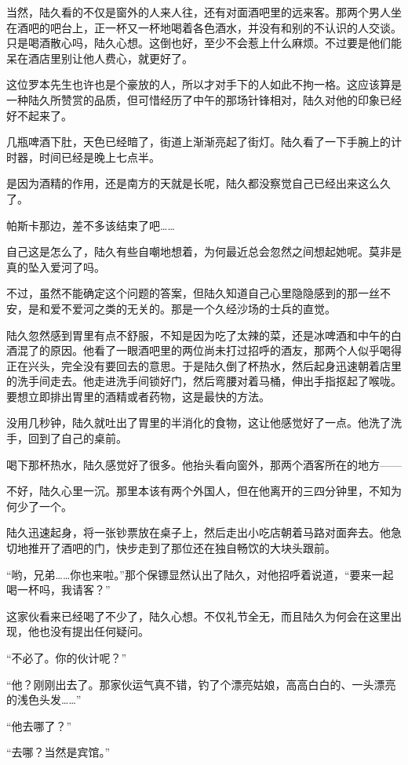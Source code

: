 当然，陆久看的不仅是窗外的人来人往，还有对面酒吧里的远来客。那两个男人坐在酒吧的吧台上，正一杯又一杯地喝着各色酒水，并没有和别的不认识的人交谈。只是喝酒散心吗，陆久心想。这倒也好，至少不会惹上什么麻烦。不过要是他们能呆在酒店里别让他人费心，就更好了。

这位罗本先生也许也是个豪放的人，所以才对手下的人如此不拘一格。这应该算是一种陆久所赞赏的品质，但可惜经历了中午的那场针锋相对，陆久对他的印象已经好不起来了。

几瓶啤酒下肚，天色已经暗了，街道上渐渐亮起了街灯。陆久看了一下手腕上的计时器，时间已经是晚上七点半。

是因为酒精的作用，还是南方的天就是长呢，陆久都没察觉自己已经出来这么久了。

帕斯卡那边，差不多该结束了吧……

自己这是怎么了，陆久有些自嘲地想着，为何最近总会忽然之间想起她呢。莫非是真的坠入爱河了吗。

不过，虽然不能确定这个问题的答案，但陆久知道自己心里隐隐感到的那一丝不安，是和爱不爱河之类的无关的。那是一个久经沙场的士兵的直觉。

陆久忽然感到胃里有点不舒服，不知是因为吃了太辣的菜，还是冰啤酒和中午的白酒混了的原因。他看了一眼酒吧里的两位尚未打过招呼的酒友，那两个人似乎喝得正在兴头，完全没有要回去的意思。于是陆久倒了杯热水，然后起身迅速朝着店里的洗手间走去。他走进洗手间锁好门，然后弯腰对着马桶，伸出手指抠起了喉咙。要想立即排出胃里的酒精或者药物，这是最快的方法。

没用几秒钟，陆久就吐出了胃里的半消化的食物，这让他感觉好了一点。他洗了洗手，回到了自己的桌前。

喝下那杯热水，陆久感觉好了很多。他抬头看向窗外，那两个酒客所在的地方——

不好，陆久心里一沉。那里本该有两个外国人，但在他离开的三四分钟里，不知为何少了一个。

陆久迅速起身，将一张钞票放在桌子上，然后走出小吃店朝着马路对面奔去。他急切地推开了酒吧的门，快步走到了那位还在独自畅饮的大块头跟前。

“哟，兄弟……你也来啦。”那个保镖显然认出了陆久，对他招呼着说道，“要来一起喝一杯吗，我请客？”

这家伙看来已经喝了不少了，陆久心想。不仅礼节全无，而且陆久为何会在这里出现，他也没有提出任何疑问。

“不必了。你的伙计呢？”

“他？刚刚出去了。那家伙运气真不错，钓了个漂亮姑娘，高高白白的、一头漂亮的浅色头发……”

“他去哪了？”

“去哪？当然是宾馆。”

